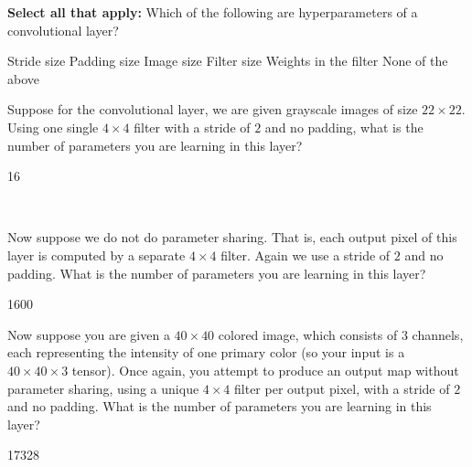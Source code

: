 \documentclass[11pt,addpoints,answers]{exam}
\newcommand{\sall}{\textbf{Select all that apply: }}
\begin{document}
\begin{questions}
\begin{parts}
\begin{subparts}
    \vspace{4mm}
    
    \subpart[1] \sall Which of the following are hyperparameters of a convolutional layer?
    \checkboxchar{$\Box$} \checkedchar{$\blacksquare$}
    \begin{checkboxes}
        \CorrectChoice Stride size
        \CorrectChoice Padding size
        \choice Image size
        \CorrectChoice Filter size
        \choice Weights in the filter
        \choice None of the above
    \end{checkboxes}
    
    \vspace{4mm}

    \subpart[1] Suppose for the convolutional layer, we are given grayscale images of size $22\times 22$. Using one single $4 \times 4$ filter with a stride of $2$ and no padding, what is the number of parameters you are learning in this layer? \\
    \begin{your_solution}[height=2cm,width=4cm]
        16
    \end{your_solution}\\
    
    \vspace{4mm}
    
    \subpart[1] Now suppose we do not do parameter sharing. That is, each output pixel of this layer is computed by a separate $4 \times 4$ filter. Again we use a stride of $2$ and no padding. What is the number of parameters you are learning in this layer? \\
    \begin{your_solution}[height=2cm,width=4cm]
        1600
    \end{your_solution}

    \newpage
    
    \subpart[1] Now suppose you are given a $40 \times 40$ colored image, which consists of $3$ channels, each representing the intensity of one primary color (so your input is a $40 \times 40 \times 3$ tensor). Once again, you attempt to produce an output map without parameter sharing, using a unique $4 \times 4$ filter per output pixel, with a stride of $2$ and no padding. What is the number of parameters you are learning in this layer? \\
    \begin{your_solution}[height=2cm,width=4cm]
        17328
    \end{your_solution}\\


\end{subparts}
\end{parts}
\end{questions}
\end{document}
